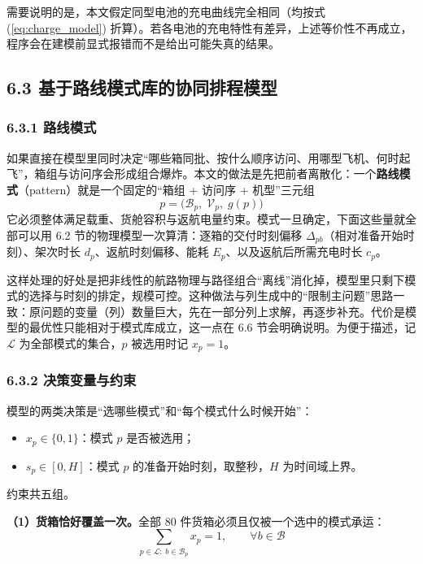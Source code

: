 \documentclass[withoutpreface,bwprint]{format}
\begin{document}
需要说明的是，本文假定同型电池的充电曲线完全相同（均按式 (\ref{eq:charge_model}) 折算）。若各电池的充电特性有差异，上述等价性不再成立，程序会在建模前显式报错而不是给出可能失真的结果。

\subsection{6.3 基于路线模式库的协同排程模型}

\subsubsection{6.3.1 路线模式}
如果直接在模型里同时决定“哪些箱同批、按什么顺序访问、用哪型飞机、何时起飞”，箱组与访问序会形成组合爆炸。本文的做法是先把前者离散化：一个\textbf{路线模式}（pattern）就是一个固定的“箱组 + 访问序 + 机型”三元组
\begin{equation}
p = \bigl(\mathcal{B}_p,\; \mathcal{V}_p,\; g(p)\bigr)
\end{equation}
它必须整体满足载重、货舱容积与返航电量约束。模式一旦确定，下面这些量就全部可以用 6.2 节的物理模型一次算清：逐箱的交付时刻偏移 $\Delta_{pb}$（相对准备开始时刻）、架次时长 $d_p$、返航时刻偏移、能耗 $E_p$、以及返航后所需充电时长 $c_p$。

这样处理的好处是把非线性的航路物理与路径组合“离线”消化掉，模型里只剩下模式的选择与时刻的排定，规模可控。这种做法与列生成中的“限制主问题”思路一致：原问题的变量（列）数量巨大，先在一部分列上求解，再逐步补充\cite{barnhart1998}。代价是模型的最优性只能相对于模式库成立，这一点在 6.6 节会明确说明。为便于描述，记 $\mathcal{L}$ 为全部模式的集合，$p$ 被选用时记 $x_p = 1$。

\subsubsection{6.3.2 决策变量与约束}
模型的两类决策是“选哪些模式”和“每个模式什么时候开始”：

\begin{itemize}[leftmargin=*]
    \item $x_p \in \{0,1\}$：模式 $p$ 是否被选用；
    \item $s_p \in [0, H]$：模式 $p$ 的准备开始时刻，取整秒，$H$ 为时间域上界。
\end{itemize}

约束共五组。

\textbf{（1）货箱恰好覆盖一次。}全部 80 件货箱必须且仅被一个选中的模式承运：
\begin{equation}
\sum_{p \in \mathcal{L}:\; b \in \mathcal{B}_p} x_p = 1, \qquad \forall b \in \mathcal{B}
\end{equation}
\end{document}
